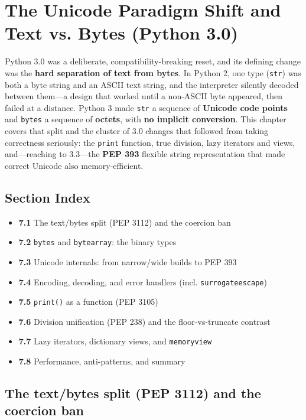 \chapter{The Unicode Paradigm Shift and Text vs. Bytes (Python 3.0)}

Python 3.0 was a deliberate, compatibility-breaking reset, and its defining change was the
\textbf{hard separation of text from bytes}. In Python 2, one type (\texttt{str}) was both a byte
string and an ASCII text string, and the interpreter silently decoded between them---a design
that worked until a non-ASCII byte appeared, then failed at a distance. Python 3 made
\texttt{str} a sequence of \textbf{Unicode code points} and \texttt{bytes} a sequence of
\textbf{octets}, with \textbf{no implicit conversion}. This chapter covers that split and the
cluster of 3.0 changes that followed from taking correctness seriously: the \texttt{print}
function, true division, lazy iterators and views, and---reaching to 3.3---the \textbf{PEP 393}
flexible string representation that made correct Unicode also memory-efficient.

\section*{Section Index}
\begin{itemize}
  \item \textbf{7.1} The text/bytes split (PEP 3112) and the coercion ban
  \item \textbf{7.2} \texttt{bytes} and \texttt{bytearray}: the binary types
  \item \textbf{7.3} Unicode internals: from narrow/wide builds to PEP 393
  \item \textbf{7.4} Encoding, decoding, and error handlers (incl. \texttt{surrogateescape})
  \item \textbf{7.5} \texttt{print()} as a function (PEP 3105)
  \item \textbf{7.6} Division unification (PEP 238) and the floor-vs-truncate contrast
  \item \textbf{7.7} Lazy iterators, dictionary views, and \texttt{memoryview}
  \item \textbf{7.8} Performance, anti-patterns, and summary
\end{itemize}

\section{The text/bytes split (PEP 3112) and the coercion ban}

